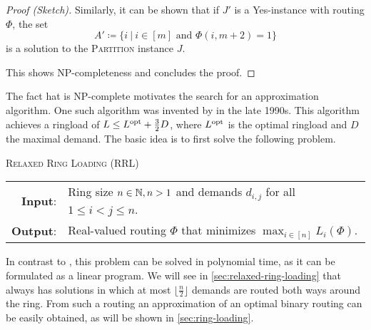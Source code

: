 \begin{proof}[Proof (Sketch)]
	Similarly, it can be shown that if $J'$ is a Yes-instance with routing $\Phi$, the set 
	\begin{equation}
		A' \coloneqq \{i \ |\ i \in [m] \text{ and } \Phi(i, m+2) = 1\}
	\end{equation} 
	is a solution to the \textsc{Partition} instance $J$.
	
	This shows NP-completeness and concludes the proof.
\end{proof}



The fact hat \RL is NP-complete motivates the search for an approximation algorithm.
One such algorithm was invented by \citet{schrijver99} in the late 1990s.
This algorithm achieves a ringload of $L \leq L^{\mathrm{opt}} + \frac{3}{2}D$, where $L^{\mathrm{opt}}$ is the optimal ringload and $D$ the maximal demand.
The basic idea is to first solve the following problem.
\begin{center}
	\begin{mdframed}
		\centering
		\textsc{Relaxed Ring Loading} (\textsc{RRL})\\[0.7em]
		\begin{tabular}{rl}
			{\bfseries Input}: & Ring size $n \in \mathbb{N}, n > 1$ and demands $d_{i, j}$ for all $1 \leq i<j\leq n$.\\
			{\bfseries Output}: & Real-valued routing $\Phi$ that minimizes $\max_{i \in [n]} L_i(\Phi)$.
		\end{tabular}
	\end{mdframed}
\end{center}
In contrast to \RL, this problem can be solved in polynomial time, as it can be formulated as a linear program.
We will see in \cref{sec:relaxed-ring-loading} that \RRL always has solutions in which at most $\lfloor \frac{n}{2} \rfloor$ demands are routed both ways around the ring.
From such a routing an approximation of an optimal binary routing can be easily obtained, as will be shown in \cref{sec:ring-loading}.

